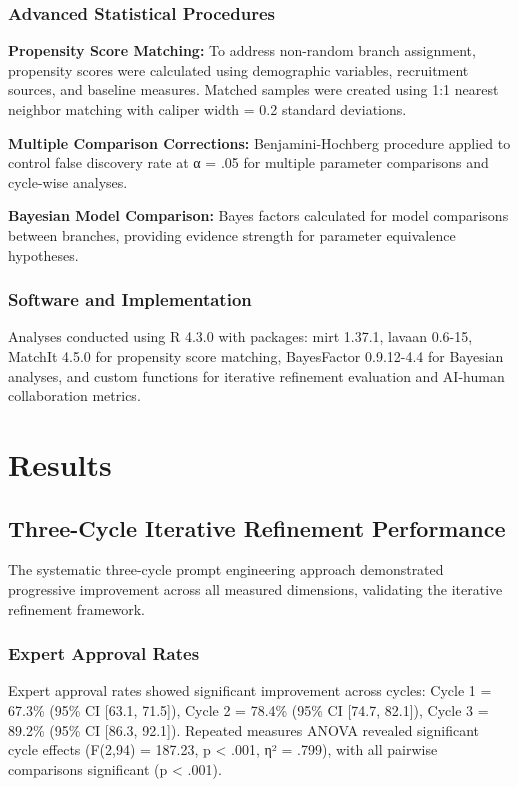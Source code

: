\documentclass[12pt,a4paper]{article}
\begin{document}
\subsubsection{Advanced Statistical Procedures}

\textbf{Propensity Score Matching:} To address non-random branch assignment, propensity scores were calculated using demographic variables, recruitment sources, and baseline measures. Matched samples were created using 1:1 nearest neighbor matching with caliper width = 0.2 standard deviations.

\textbf{Multiple Comparison Corrections:} Benjamini-Hochberg procedure applied to control false discovery rate at α = .05 for multiple parameter comparisons and cycle-wise analyses.

\textbf{Bayesian Model Comparison:} Bayes factors calculated for model comparisons between branches, providing evidence strength for parameter equivalence hypotheses.

\subsubsection{Software and Implementation}

Analyses conducted using R 4.3.0 with packages: mirt 1.37.1, lavaan 0.6-15, MatchIt 4.5.0 for propensity score matching, BayesFactor 0.9.12-4.4 for Bayesian analyses, and custom functions for iterative refinement evaluation and AI-human collaboration metrics.

\section{Results}

\subsection{Three-Cycle Iterative Refinement Performance}

The systematic three-cycle prompt engineering approach demonstrated progressive improvement across all measured dimensions, validating the iterative refinement framework.

\subsubsection{Expert Approval Rates}

Expert approval rates showed significant improvement across cycles: Cycle 1 = 67.3\% (95\% CI [63.1, 71.5]), Cycle 2 = 78.4\% (95\% CI [74.7, 82.1]), Cycle 3 = 89.2\% (95\% CI [86.3, 92.1]). Repeated measures ANOVA revealed significant cycle effects (F(2,94) = 187.23, p < .001, η² = .799), with all pairwise comparisons significant (p < .001).
\end{document}
